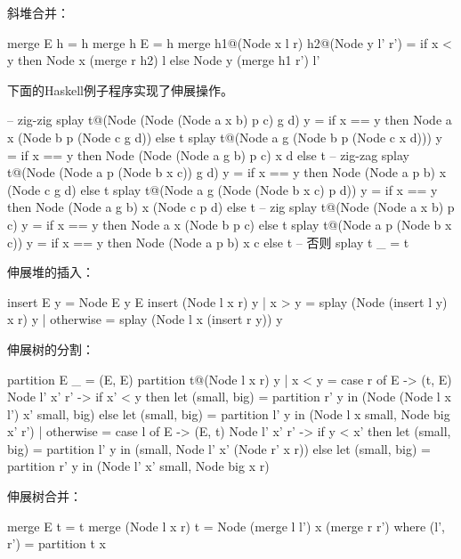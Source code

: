 \documentclass[b5paper]{ctexart}
\begin{document}
斜堆合并：

\begin{Haskell}
merge E h = h
merge h E = h
merge h1@(Node x l r) h2@(Node y l' r') =
    if x < y then Node x (merge r h2) l
    else Node y (merge h1 r') l'
\end{Haskell}

下面的Haskell例子程序实现了伸展操作。

\begin{Haskell}
-- zig-zig
splay t@(Node (Node (Node a x b) p c) g d) y =
    if x == y then Node a x (Node b p (Node c g d)) else t
splay t@(Node a g (Node b p (Node c x d))) y =
    if x == y then Node (Node (Node a g b) p c) x d else t
-- zig-zag
splay t@(Node (Node a p (Node b x c)) g d) y =
    if x == y then Node (Node a p b) x (Node c g d) else t
splay t@(Node a g (Node (Node b x c) p d)) y =
    if x == y then Node (Node a g b) x (Node c p d) else t
-- zig
splay t@(Node (Node a x b) p c) y = if x == y then Node a x (Node b p c) else t
splay t@(Node a p (Node b x c)) y = if x == y then Node (Node a p b) x c else t
-- 否则
splay t _ = t
\end{Haskell}

伸展堆的插入：

\begin{Haskell}
insert E y = Node E y E
insert (Node l x r) y
    | x > y     = splay (Node (insert l y) x r) y
    | otherwise = splay (Node l x (insert r y)) y
\end{Haskell}

伸展树的分割：

\begin{Haskell}
partition E _ = (E, E)
partition t@(Node l x r) y
    | x < y =
        case r of
          E -> (t, E)
          Node l' x' r' ->
              if x' < y then
                  let (small, big) = partition r' y in
                  (Node (Node l x l') x' small, big)
              else
                  let (small, big) = partition l' y in
                  (Node l x small, Node big x' r')
    | otherwise =
        case l of
          E -> (E, t)
          Node l' x' r' ->
              if y < x' then
                  let (small, big) = partition l' y in
                  (small, Node l' x' (Node r' x r))
              else
                  let (small, big) = partition r' y in
                  (Node l' x' small, Node big x r)
\end{Haskell}

伸展树合并：

\begin{Haskell}
merge E t = t
merge (Node l x r) t = Node (merge l l') x (merge r r')
    where (l', r') = partition t x
\end{Haskell}
\end{document}
